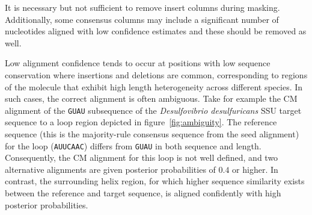 It is necessary but not sufficient to remove insert columns
during masking. Additionally, some consensus columns may include
a significant number of nucleotides aligned with low confidence
estimates and these should be removed as well. 

Low alignment confidence tends to occur at positions with low sequence
conservation where insertions and deletions are common, 
corresponding to regions of the molecule that exhibit high length
heterogeneity across different species. 
In such cases, the correct alignment is often ambiguous.
Take for example the CM alignment
of the {\tt GUAU} subsequence of the \emph{Desulfovibrio
desulfuricans} SSU target sequence to a loop region depicted in
figure~\ref{fig:ambiguity}. The reference sequence (this is the
majority-rule consensus sequence from the seed alignment) for the
loop ({\tt AUUCAAC}) differs from {\tt GUAU} in both sequence and
length. Consequently, the CM alignment for this loop is not well
defined, and two alternative alignments are given posterior
probabilities of $0.4$ or higher.  In contrast, the surrounding helix
region, for which higher sequence similarity exists between the
reference and target sequence, is aligned confidently with high
posterior probabilities.


